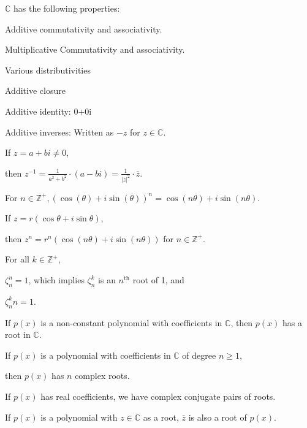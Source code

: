 \documentclass{article}
\newcommand\inv{^{-1}}
\newcommand{\Z}{\mathbb Z}
\newcommand{\C}{\mathbb C}
\begin{document}
    $\C$ has the following properties:
    
    Additive commutativity and associativity.
    
    Multiplicative Commutativity and associativity.
    
    Various distributivities %
    
    Additive closure
    
    Additive identity: 0+0i
    
    Additive inverses: Written as $-z$ for $z \in \C$.
    

    If $z=a+bi \neq 0$,
    
    then $z\inv = \frac{1}{a^2 + b^2} \cdot (a-bi) = \frac{1}{|z|^2} \cdot \overline{z}$.
    

    For $n \in\Z^+, (\cos(\theta) + i\sin(\theta))^n = \cos(n\theta) + i\sin(n\theta)$.
    

    If $z = r(\cos\theta + i\sin\theta)$,
    
    then $z^n = r^n(\cos(n\theta)+i\sin(n\theta))$ for $n \in \Z^+$.
    
    
    For all $k \in\Z^+$,
    
    $\zeta_n^n = 1$, which implies $\zeta_n^k$ is an $n^{\text{th}}$ root of 1, and
    
    $\zeta_n^kn = 1$.
    

    If $p(x)$ is a non-constant polynomial with coefficients in $\C$, then $p(x)$ has a root in $\C$.
    

    If $p(x)$ is a polynomial with coefficients in $\C$ of degree $n \geq 1$,
    
    then $p(x)$ has $n$ complex roots.
    

    If $p(x)$ has real coefficients, we have complex conjugate pairs of roots.
    
    If $p(x)$ is a polynomial with $z \in\C$ as a root, $\overline{z}$ is also a root of $p(x)$.
\end{document}
